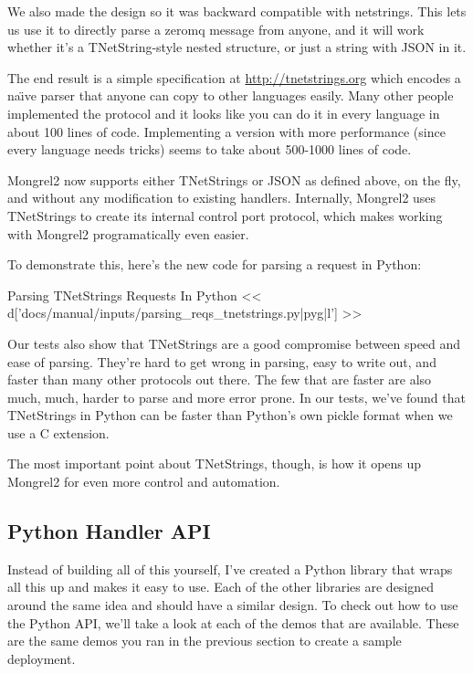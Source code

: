 We also made the design so it was backward compatible with netstrings.
This lets us use it to directly parse a zeromq message from anyone, and
it will work whether it's a TNetString-style nested structure, or just
a string with JSON in it.

The end result is a simple specification at \href{http://tnetstrings.org}{http://tnetstrings.org}
which encodes a na\"{\i}ve parser that anyone can copy to other languages easily.
Many other people implemented the protocol and it looks like you can do
it in every language in about 100 lines of code.  Implementing a version
with more performance (since every language needs tricks) seems to take
about 500-1000 lines of code.

Mongrel2 now supports either TNetStrings or JSON as defined above, on the
fly, and without any modification to existing handlers.  Internally, Mongrel2
uses TNetStrings to create its internal control port protocol, which makes
working with Mongrel2 programatically even easier.

To demonstrate this, here's the new code for parsing a request in Python:


\begin{code}{Parsing TNetStrings Requests In Python}
<< d['docs/manual/inputs/parsing_reqs_tnetstrings.py|pyg|l'] >>
\end{code}

Our tests also show that TNetStrings are a good compromise between
speed and ease of parsing.  They're hard to get wrong in parsing, easy
to write out, and faster than many other protocols out there.  The few
that are faster are also much, much, harder to parse and more error
prone.  In our tests, we've found that TNetStrings in Python can be
faster than Python's own pickle format when we use a C extension.

The most important point about TNetStrings, though, is how it opens up
Mongrel2 for even more control and automation.

\subsection{Python Handler API}

Instead of building all of this yourself, I've created a Python library
that wraps all this up and makes it easy to use.  Each of the other
libraries are designed around the same idea and should have a similar
design.  To check out how to use the Python API, we'll take a look at
each of the demos that are available.  These are the same demos you
ran in the previous section to create a sample deployment.

